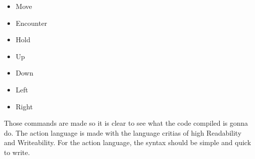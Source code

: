 \begin{itemize}
	\item Move
	\item Encounter
	\item Hold
	\item Up
	\item Down
	\item Left
	\item Right
\end{itemize}

Those commands are made so it is clear to see what the code compiled is gonna do. The action language is made with the language critias of high Readability and Writeability. For the action language, the syntax should be simple and quick to write.